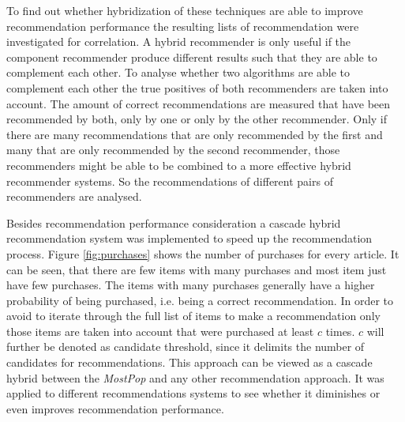 \documentclass[10pt]{reportMaster}
\begin{document}

To find out whether hybridization of these techniques are able to improve recommendation performance the resulting lists of recommendation were investigated for correlation.
A hybrid recommender is only useful if the component recommender produce different results such that they are able to complement each other.
To analyse whether two algorithms are able to complement each other the true positives of both recommenders are taken into account.
The amount of correct recommendations are measured that have been recommended by both, only by one or only by the other recommender.
Only if there are many recommendations that are only recommended by the first and many that are only recommended by the second recommender, those recommenders might be able to be combined to a more effective hybrid recommender systems.
So the recommendations of different pairs of recommenders are analysed. %

Besides recommendation performance consideration a cascade hybrid recommendation system was implemented to speed up the recommendation process.
Figure \ref{fig:purchases} shows the number of purchases for every article.
It can be seen, that there are few items with many purchases and most item just have few purchases.
The items with many purchases generally have a higher probability of being purchased, i.e. being a correct recommendation.
In order to avoid to iterate through the full list of items to make a recommendation only those items are taken into account that were purchased at least $c$ times.
$c$ will further be denoted as candidate threshold, since it delimits the number of candidates for recommendations.
This approach can be viewed as a cascade hybrid between the \textit{MostPop} and any other recommendation approach.
It was applied to different recommendations systems to see whether it diminishes or even improves recommendation performance.
\end{document}
